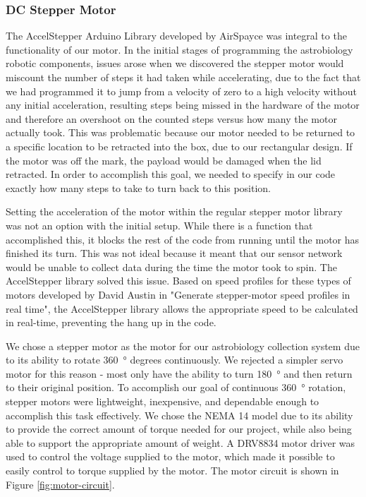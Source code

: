 \subsubsection{DC Stepper Motor}
The AccelStepper Arduino Library developed by AirSpayce \cite{AccelStepper} was integral to the functionality of our motor.
In the initial stages of programming the astrobiology robotic components, issues arose when we discovered the stepper motor would miscount the number of steps it had taken while accelerating, due to the fact that we had programmed it to jump from a velocity of zero to a high velocity without any initial acceleration, resulting steps being missed in the hardware of the motor and therefore an overshoot on the counted steps versus how many the motor actually took.
This was problematic because our motor needed to be returned to a specific location to be retracted into the box, due to our rectangular design.
If the motor was off the mark, the payload would be damaged when the lid retracted.
In order to accomplish this goal, we needed to specify in our code exactly how many steps to take to turn back to this position.

Setting the acceleration of the motor within the regular stepper motor library was not an option with the initial setup.
While there is a function that accomplished this, it blocks the rest of the code from running until the motor has finished its turn.
This was not ideal because it meant that our sensor network would be unable to collect data during the time the motor took to spin. The AccelStepper library solved this issue.
Based on speed profiles for these types of motors developed by David Austin in "Generate stepper-motor speed profiles in real time", the AccelStepper library allows the appropriate speed to be calculated in real-time, preventing the hang up in the code. 

We chose a stepper motor as the motor for our astrobiology collection system due to its ability to rotate \SI{360}{\degree} degrees continuously.
We rejected a simpler servo motor for this reason - most only have the ability to turn \SI{180}{\degree} and then return to their original position.
To accomplish our goal of continuous \SI{360}{\degree} rotation, stepper motors were lightweight, inexpensive, and dependable enough to accomplish this task effectively.
We chose the NEMA 14 model due to its ability to provide the correct amount of torque needed for our project, while also being able to support the appropriate amount of weight.
A DRV8834 motor driver was used to control the voltage supplied to the motor, which made it possible to easily control to torque supplied by the motor.
The motor circuit is shown in Figure \ref{fig:motor-circuit}.

